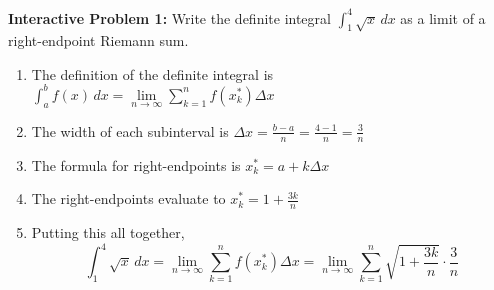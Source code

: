 \documentclass[12pt]{article}
\renewcommand{\lim}{\mathop{\mathrm{lim}}\limits}
\newcommand{\prenotephantom}[1]{#1}
\begin{document}
\textbf{Interactive Problem 1: } 
Write the definite integral $\int_1^4 \sqrt{x} \,dx$ as a limit of a right-endpoint Riemann sum. 

\begin{enumerate}[item-label={(\alph*)}]
    \item The definition of the definite integral is $\int_a^b f(x) \,dx = \prenotephantom{\lim_{n \to \infty} \sum_{k=1}^n f(x_k^*) \Delta x}$ \\[0.5cm]
    \item The width of each subinterval is $\Delta x = \prenotephantom{ \frac{b-a}{n} = \frac{4-1}{n} = \frac{3}{n}}$ \\[0.5cm]
    \item The formula for right-endpoints is $x_k^* = \prenotephantom{a + k \Delta x}$ \\[0.5cm]
    \item The right-endpoints evaluate to $x_k^* = \prenotephantom{1 + \frac{3k}{n}}$ \\[0.5cm]
    \item Putting this all together, 
    \[ \int_1^4 \sqrt{x} \,dx = \prenotephantom{\lim_{n \to \infty} \sum_{k=1}^n f(x_k^*) \Delta x = \lim_{n \to \infty} \sum_{k=1}^n \sqrt{1 + \frac{3k}{n}} \cdot \frac{3}{n}} \]
\end{enumerate}
\end{document}
